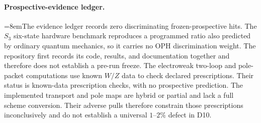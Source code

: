 \documentclass[11pt]{article}
\begin{document}
\paragraph{Prospective-evidence ledger.}
{\emergencystretch=8em\relax The evidence ledger records zero discriminating frozen-prospective hits. The \(S_3\)
six-state hardware benchmark reproduces a programmed ratio also predicted by ordinary quantum
mechanics, so it carries no OPH discrimination weight. The repository first records its code,
results, and documentation together and therefore does not establish a pre-run freeze. The
electroweak two-loop and
pole-packet computations use known \(W/Z\) data to check declared prescriptions. Their status is
known-data prescription checks, with no prospective prediction. The implemented transport and pole
maps are hybrid or partial and lack a full scheme conversion. Their adverse pulls therefore
constrain those prescriptions inconclusively and do not establish a universal \(1\)--\(2\%\) defect
in D10.\par}
\end{document}
